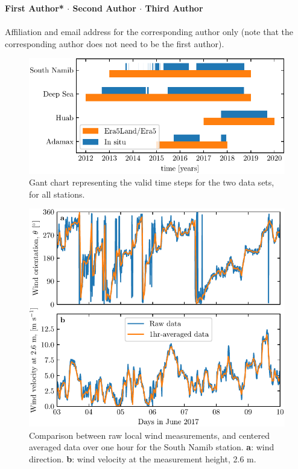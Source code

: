 {\textbf{First Author* $\cdot$ Second Author $\cdot$ Third Author \\}}
\\
\text{*}Affiliation and email address for the corresponding author only (note that the corresponding author does not need to be the first author).

\begin{figure}
  \centering
  \includegraphics[scale=1]{Figures/Figure1_supp.pdf}
  \caption{Gant chart representing the valid time steps for the two data sets, for all stations.}
  \label{Fig1_supp}
\end{figure}

\begin{figure}
  \centering
  \includegraphics[scale=1]{Figures/Figure2_supp.pdf}
  \caption{Comparison between raw local wind measurements, and centered averaged data over one hour for the South Namib station. \textbf{a}: wind direction. \textbf{b}: wind velocity at the measurement height, 2.6 m.}
  \label{Fig2_supp}
\end{figure}

